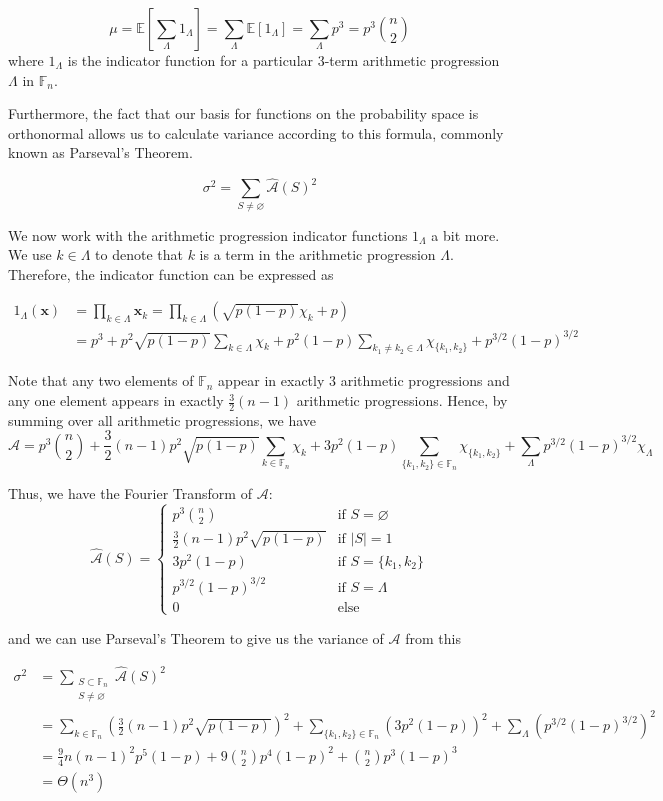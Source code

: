 \documentclass{article}
\newcommand{\p}[1]{\left(#1\right)}
\newcommand{\s}[1]{\left[#1\right]}
\newcommand{\abs}[1]{\left\lvert#1\right\rvert}
\newcommand{\ap}{\mathcal{A}}
\newcommand{\E}{\mathbb{E}}
\newcommand{\F}{\mathbb{F}}
\newcommand{\bfx}{\mathbf{x}}
\theoremstyle{definition}
\theoremstyle{remark}
\begin{document}
\[\mu = \E\s{\sum_{\Lambda} {1_\Lambda}} = \sum_{\Lambda} {\E[1_\Lambda]} = \sum_{\Lambda} {p^3} = p^3\binom{n}{2}\]
where $1_\Lambda$ is the indicator function for a particular 3-term arithmetic progression $\Lambda$ in $\F_n$.

Furthermore, the fact that our basis for functions on the probability space is orthonormal allows us to calculate variance according to this formula, commonly known as Parseval's Theorem.

\[\sigma^2 = \sum_{S \neq \varnothing} {\hat{\ap}(S)^2} \]

We now work with the arithmetic progression indicator functions $1_\Lambda$ a bit more. We use $k \in \Lambda$ to denote that $k$ is a term in the arithmetic progression $\Lambda$. Therefore, the indicator function can be expressed as

\begin{align*}
1_\Lambda(\bfx) &= \prod_{k \in \Lambda} {\bfx_k} = \prod_{k \in \Lambda} {\p{\sqrt{p(1-p)}\chi_k + p}} \\ 
&= p^3+p^2\sqrt{p(1-p)}\sum_{k \in \Lambda} {\chi_k} + p^2(1-p)\sum_{k_1 \neq k_2 \in \Lambda} {\chi_{\{k_1, k_2\}}} + p^{3/2}(1-p)^{3/2} 
\end{align*}

Note that any two elements of $\F_n$ appear in exactly 3 arithmetic progressions and any one element appears in exactly $\frac{3}{2}(n-1)$ arithmetic progressions. Hence, by summing over all arithmetic progressions, we have
\[\ap = p^3 {{n}\choose{2}} + \frac{3}{2}(n-1)p^2\sqrt{p(1-p)}\sum_{k \in \F_n} \chi_k + 3p^2(1-p)\sum_{\{k_1,k_2\} \in \F_n} \chi_{\{k_1, k_2 \}} + \sum_{\Lambda} p^{3/2}(1-p)^{3/2}\chi_{\Lambda}\]

Thus, we have the Fourier Transform of $\ap$:
\[\hat{\ap}(S) = \begin{cases} 
      p^3 {{n}\choose{2}} & \text{if } S = \varnothing \\[10pt]
      \frac{3}{2}(n-1)p^2\sqrt{p(1-p)} & \text{if } \abs{S} = 1 \\[10pt]
      3p^2(1-p) & \text{if } S = \{k_1,k_2\} \\[10pt]
      p^{3/2}(1-p)^{3/2} & \text{if } S = \Lambda \\[10pt]
      0 & \text{else}
\end{cases} \]

and we can use Parseval's Theorem to give us the variance of $\ap$ from this

\begin{align*}
\sigma^2 &= \sum_{\substack{S \subset \F_n \\ S \neq \varnothing}} {\hat{\ap}(S)^2} \\
&= \sum_{k \in \F_n} {\p{\frac{3}{2}(n-1)p^2\sqrt{p(1-p)}}^2} + \sum_{\{k_1, k_2\} \in \F_n} {\p{3p^2(1-p)}^2} + \sum_{\Lambda} {\p{p^{3/2}(1-p)^{3/2}}^2} \\
&= \frac{9}{4}n(n-1)^2p^5(1-p) + 9\binom{n}{2}p^4(1-p)^2 + \binom{n}{2}p^3(1-p)^3 \\
&= \Theta(n^3)
\end{align*}
\end{document}
